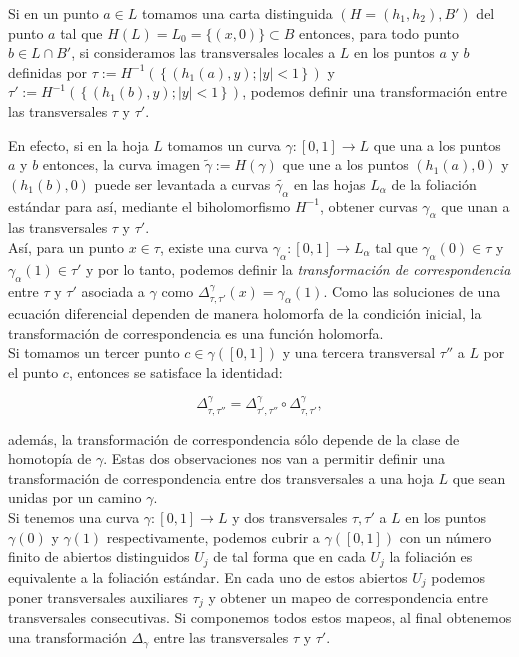 Si en un punto $a\in L$ tomamos una carta distinguida $(H=(h_{1},h_{2}),B')$ del punto $a$ tal que $H(L)=L_{0}=\{(x,0)\}\subset B$ entonces, para todo punto $b\in L\cap B'$, si consideramos las transversales locales a $L$ en los puntos $a$ y $b$ definidas por $\tau:=H^{-1}(\,\{\,(h_{1}(a),y); \left|y\right|<1 \,\}\,)$ y $\tau':=H^{-1}(\,\{\,(h_{1}(b),y); \left|y\right|<1 \,\}\,)$, podemos definir una transformación entre las transversales $\tau$ y $\tau'$.

En efecto, si en la hoja $L$ tomamos un curva $\gamma\colon [0,1]\rightarrow L$ que una a los puntos $a$ y $b$ entonces, la curva imagen $\tilde{\gamma}:=H(\gamma)$ que une a los puntos $(h_{1}(a),0)$ y $(h_{1}(b),0)$ puede ser levantada a curvas $\tilde{\gamma_{\alpha}}$ en las hojas $L_{\alpha}$ de la foliación estándar para así, mediante el biholomorfismo $H^{-1}$, obtener curvas $\gamma_{\alpha}$ que unan a las transversales $\tau$ y $\tau'$.\\

Así, para un punto $x\in\tau$, existe una curva $\gamma_{\alpha}\colon[0,1]\rightarrow L_{\alpha}$ tal que $\gamma_{\alpha}(0)\in\tau$ y $\gamma_{\alpha}(1)\in\tau'$ y por lo tanto, podemos definir la  \emph{transformación de correspondencia} entre $\tau$  y $\tau'$ asociada a $\gamma$ como $\Delta^{\gamma}_{\tau,\tau'}(x)=\gamma_{\alpha}(1)$. Como las soluciones de una ecuación diferencial dependen de manera holomorfa de la condición inicial, la transformación de correspondencia es una función holomorfa.\\

Si tomamos un tercer punto $c\in\gamma([0,1])$ y una tercera transversal $\tau''$ a $L$ por el punto $c$, entonces se satisface la identidad:

\begin{equation*}
\label{IdentidadCorrespondencia}
\Delta^{\gamma}_{\tau,\tau''}=\Delta^{\gamma}_{\tau',\tau''}\circ\Delta^{\gamma}_{\tau,\tau'},
\end{equation*}

\noindent además, la transformación de correspondencia sólo depende de la clase de homotopía de $\gamma$. Estas dos observaciones nos van a permitir definir una transformación de correspondencia entre dos transversales a una hoja $L$ que sean unidas por un camino $\gamma$.\\  

Si tenemos una curva $\gamma\colon [0,1]\rightarrow L$ y dos transversales $\tau,\tau'$ a $L$ en los puntos $\gamma(0)$ y $\gamma(1)$ respectivamente, podemos cubrir a $\gamma([0,1])$ con un número finito de abiertos  distinguidos $U_{j}$ de tal forma que en cada $U_{j}$ la foliación es equivalente a la foliación estándar. En cada uno de estos abiertos $U_{j}$ podemos poner transversales auxiliares $\tau_{j}$ y obtener un mapeo de correspondencia entre transversales consecutivas. Si componemos todos estos mapeos, al final obtenemos una transformación $\Delta_{\gamma}$ entre las transversales $\tau$ y $\tau'$.\\

